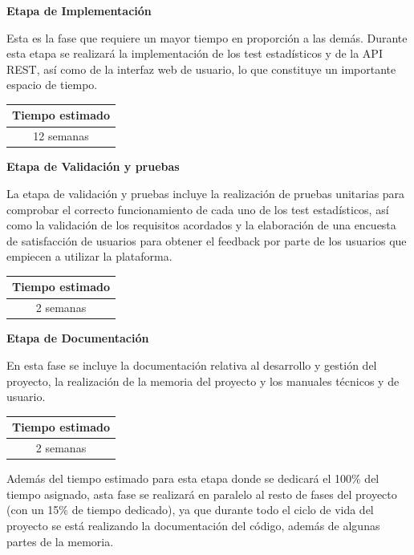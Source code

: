\noindent
\textbf{Etapa de Implementación}

Esta es la fase que requiere un mayor tiempo en proporción a las demás. Durante esta etapa se realizará la implementación de los test estadísticos y de la API REST, así como de la interfaz web de usuario, lo que constituye un importante espacio de tiempo.

\begin{table}[H]
	\centering
	\begin{tabular}{|c|}
		\hline
		\textbf{Tiempo estimado} \\ \hline
		12 semanas \\ \hline
	\end{tabular}
\end{table}

\noindent
\textbf{Etapa de Validación y pruebas}

La etapa de validación y pruebas incluye la realización de pruebas unitarias para comprobar el correcto funcionamiento de cada uno de los test estadísticos, así como la validación de los requisitos acordados y la elaboración de una encuesta de satisfacción de usuarios para obtener el feedback por parte de los usuarios que empiecen a utilizar la plataforma.

\begin{table}[H]
	\centering
	\begin{tabular}{|c|}
		\hline
		\textbf{Tiempo estimado} \\ \hline
		2 semanas \\ \hline
	\end{tabular}
\end{table}

\noindent
\textbf{Etapa de Documentación}

En esta fase se incluye la documentación relativa al desarrollo y gestión del proyecto, la realización de la memoria del proyecto y los manuales técnicos y de usuario.

\begin{table}[H]
	\centering
	\begin{tabular}{|c|}
		\hline
		\textbf{Tiempo estimado} \\ \hline
		2 semanas \\ \hline
	\end{tabular}
\end{table}

Además del tiempo estimado para esta etapa donde se dedicará el 100\% del tiempo asignado, asta fase se realizará en paralelo al resto de fases del proyecto (con un 15\% de tiempo dedicado), ya que durante todo el ciclo de vida del proyecto se está realizando la documentación del código, además de algunas partes de la memoria.

